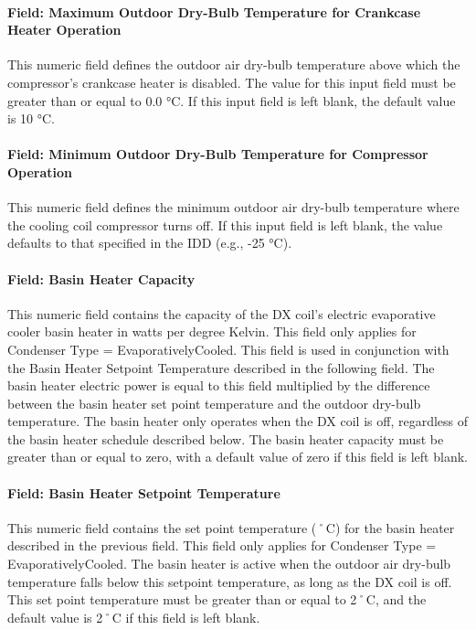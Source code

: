 \paragraph{Field: Maximum Outdoor Dry-Bulb Temperature for Crankcase Heater Operation}\label{field-maximum-outdoor-dry-bulb-temperature-for-crankcase-heater-operation-2}

This numeric field defines the outdoor air dry-bulb temperature above which the compressor's crankcase heater is disabled. The value for this input field must be greater than or equal to 0.0 °C. If this input field is left blank, the default value is 10 °C.

\paragraph{Field: Minimum Outdoor Dry-Bulb Temperature for Compressor Operation}

This numeric field defines the minimum outdoor air dry-bulb temperature where the cooling coil compressor turns off. If this input field is left blank, the value defaults to that specified in the IDD (e.g., -25 °C).

\paragraph{Field: Basin Heater Capacity}\label{field-basin-heater-capacity-3-000}

This numeric field contains the capacity of the DX coil's electric evaporative cooler basin heater in watts per degree Kelvin. This field only applies for Condenser Type = EvaporativelyCooled. This field is used in conjunction with the Basin Heater Setpoint Temperature described in the following field. The basin heater electric power is equal to this field multiplied by the difference between the basin heater set point temperature and the outdoor dry-bulb temperature. The basin heater only operates when the DX coil is off, regardless of the basin heater schedule described below. The basin heater capacity must be greater than or equal to zero, with a default value of zero if this field is left blank.

\paragraph{Field: Basin Heater Setpoint Temperature}\label{field-basin-heater-setpoint-temperature-3-000}

This numeric field contains the set point temperature (˚C) for the basin heater described in the previous field. This field only applies for Condenser Type = EvaporativelyCooled. The basin heater is active when the outdoor air dry-bulb temperature falls below this setpoint temperature, as long as the DX coil is off. This set point temperature must be greater than or equal to 2˚C, and the default value is 2˚C if this field is left blank.

